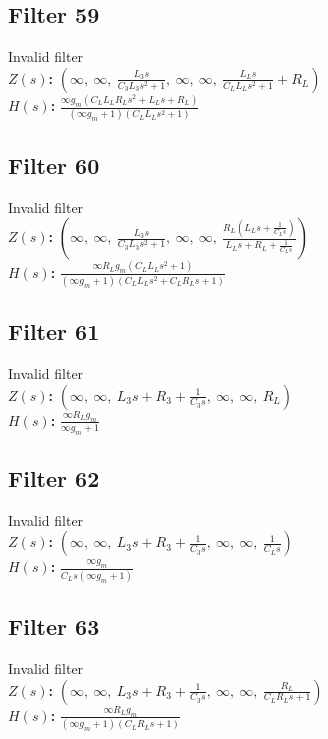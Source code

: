 \documentclass{article}
\begin{document}
\subsection*{Filter 59}
Invalid filter \\ 
\textbf{$Z(s)$:} $\left( \infty, \  \infty, \  \frac{L_{3} s}{C_{3} L_{3} s^{2} + 1}, \  \infty, \  \infty, \  \frac{L_{L} s}{C_{L} L_{L} s^{2} + 1} + R_{L}\right)$ \\ 
\textbf{$H(s)$:} $\frac{\infty g_{m} \left(C_{L} L_{L} R_{L} s^{2} + L_{L} s + R_{L}\right)}{\left(\infty g_{m} + 1\right) \left(C_{L} L_{L} s^{2} + 1\right)}$ \\ 
\subsection*{Filter 60}
Invalid filter \\ 
\textbf{$Z(s)$:} $\left( \infty, \  \infty, \  \frac{L_{3} s}{C_{3} L_{3} s^{2} + 1}, \  \infty, \  \infty, \  \frac{R_{L} \left(L_{L} s + \frac{1}{C_{L} s}\right)}{L_{L} s + R_{L} + \frac{1}{C_{L} s}}\right)$ \\ 
\textbf{$H(s)$:} $\frac{\infty R_{L} g_{m} \left(C_{L} L_{L} s^{2} + 1\right)}{\left(\infty g_{m} + 1\right) \left(C_{L} L_{L} s^{2} + C_{L} R_{L} s + 1\right)}$ \\ 
\subsection*{Filter 61}
Invalid filter \\ 
\textbf{$Z(s)$:} $\left( \infty, \  \infty, \  L_{3} s + R_{3} + \frac{1}{C_{3} s}, \  \infty, \  \infty, \  R_{L}\right)$ \\ 
\textbf{$H(s)$:} $\frac{\infty R_{L} g_{m}}{\infty g_{m} + 1}$ \\ 
\subsection*{Filter 62}
Invalid filter \\ 
\textbf{$Z(s)$:} $\left( \infty, \  \infty, \  L_{3} s + R_{3} + \frac{1}{C_{3} s}, \  \infty, \  \infty, \  \frac{1}{C_{L} s}\right)$ \\ 
\textbf{$H(s)$:} $\frac{\infty g_{m}}{C_{L} s \left(\infty g_{m} + 1\right)}$ \\ 
\subsection*{Filter 63}
Invalid filter \\ 
\textbf{$Z(s)$:} $\left( \infty, \  \infty, \  L_{3} s + R_{3} + \frac{1}{C_{3} s}, \  \infty, \  \infty, \  \frac{R_{L}}{C_{L} R_{L} s + 1}\right)$ \\ 
\textbf{$H(s)$:} $\frac{\infty R_{L} g_{m}}{\left(\infty g_{m} + 1\right) \left(C_{L} R_{L} s + 1\right)}$ \\ 
\end{document}
